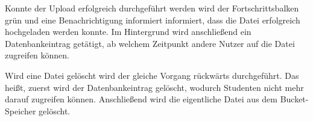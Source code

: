 Konnte der Upload erfolgreich durchgeführt werden wird der Fortschrittsbalken grün und eine Benachrichtigung informiert informiert, dass die Datei erfolgreich hochgeladen werden konnte.
Im Hintergrund wird anschließend ein Datenbankeintrag getätigt, ab welchem Zeitpunkt andere Nutzer auf die Datei zugreifen können.

Wird eine Datei gelöscht wird der gleiche Vorgang rückwärts durchgeführt.
Das heißt, zuerst wird der Datenbankeintrag gelöscht, wodurch Studenten nicht mehr darauf zugreifen können.
Anschließend wird die eigentliche Datei aus dem Bucket-Speicher gelöscht.







